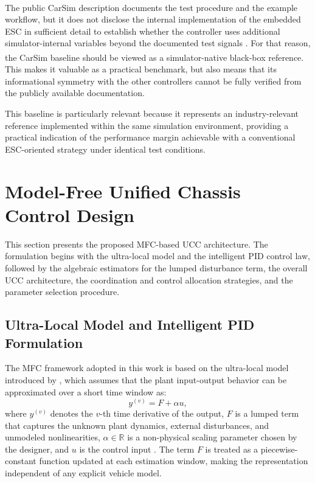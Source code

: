 \documentclass[sn-chicago,iicol]{sn-jnl}
\theoremstyle{thmstyleone}%
\theoremstyle{thmstyletwo}%
\theoremstyle{thmstylethree}%
\begin{document}
The public CarSim\textsuperscript{\textregistered} description documents the 
test procedure and the example workflow, but it does not disclose the 
internal implementation of the embedded ESC in sufficient detail to 
establish whether the controller uses additional simulator-internal 
variables beyond the documented test signals \citep{carsim_fmvss126}. For 
that reason, the CarSim\textsuperscript{\textregistered} baseline should be 
viewed as a simulator-native black-box reference. This makes it valuable as 
a practical benchmark, but also means that its informational symmetry with 
the other controllers cannot be fully verified from the publicly available 
documentation.

This baseline is particularly relevant because it represents an 
industry-relevant reference implemented within the same simulation 
environment, providing a practical indication of the performance margin 
achievable with a conventional ESC-oriented strategy under identical test 
conditions.

\section{Model-Free Unified Chassis Control 
         Design}\label{sec:mfc_ucc}

This section presents the proposed MFC-based UCC architecture. The 
formulation begins with the ultra-local model and the intelligent PID 
control law, followed by the algebraic estimators for the lumped 
disturbance term, the overall UCC architecture, the coordination and 
control allocation strategies, and the parameter selection procedure.

\subsection{Ultra-Local Model and Intelligent PID 
            Formulation}\label{sec:ulmodel}

The MFC framework adopted in this work is based on the ultra-local model 
introduced by \citet{Fliess2008}, which assumes that the plant input-output 
behavior can be approximated over a short time window as:
\begin{equation}
    y^{(v)} = F + \alpha u,
    \label{Eq:Def-MFC}
\end{equation}
where $y^{(v)}$ denotes the $v$-th time derivative of the output, $F$ is 
a lumped term that captures the unknown plant dynamics, external 
disturbances, and unmodeled nonlinearities, $\alpha \in \mathbb{R}$ is a 
non-physical scaling parameter chosen by the designer, and $u$ is the 
control input \citep{Fliess2009}. The term $F$ is treated as a 
piecewise-constant function updated at each estimation window, making the 
representation independent of any explicit vehicle model.
\end{document}
